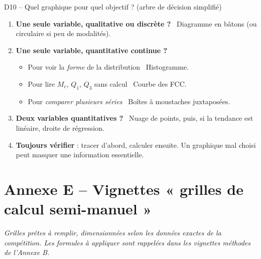 \documentclass[11pt,a4paper]{article}
\begin{document}
\vspace{0.3cm}

\begin{vignetteCours}{D10 -- Quel graphique pour quel objectif ? (arbre de décision simplifié)}
\begin{enumerate}[leftmargin=*,itemsep=2pt]
  \item \textbf{Une seule variable, qualitative ou discrète ?} \textrightarrow\ Diagramme en bâtons (ou circulaire si peu de modalités).
  \item \textbf{Une seule variable, quantitative continue ?}
    \begin{itemize}[leftmargin=*,itemsep=0pt]
      \item Pour voir la \emph{forme} de la distribution \textrightarrow\ Histogramme.
      \item Pour lire $M_e$, $Q_1$, $Q_3$ sans calcul \textrightarrow\ Courbe des FCC.
      \item Pour \emph{comparer plusieurs séries} \textrightarrow\ Boîtes à moustaches juxtaposées.
    \end{itemize}
  \item \textbf{Deux variables quantitatives ?} \textrightarrow\ Nuage de points, puis, si la tendance est linéaire, droite de régression.
  \item \textbf{Toujours vérifier} : tracer d'abord, calculer ensuite. Un graphique mal choisi peut masquer une information essentielle.
\end{enumerate}
\end{vignetteCours}

\newpage

\section*{\color{bioaccent}Annexe E -- Vignettes « grilles de calcul semi-manuel »}
\emph{Grilles prêtes à remplir, dimensionnées selon les données exactes de la compétition. Les formules à appliquer sont rappelées dans les vignettes méthodes de l'Annexe B.}

\vspace{0.3cm}
\end{document}
